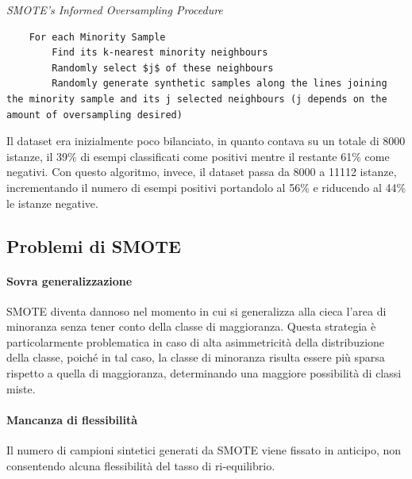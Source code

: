\lstset{style=customAlg}
\begin{algorithm}
	\caption{\emph{SMOTE’s Informed Oversampling Procedure}}
	\begin{lstlisting}
	For each Minority Sample
	    Find its k-nearest minority neighbours
	    Randomly select $j$ of these neighbours
	    Randomly generate synthetic samples along the lines joining the minority sample and its j selected neighbours (j depends on the amount of oversampling desired) 
	\end{lstlisting}
\end{algorithm}

Il dataset era inizialmente poco bilanciato, in quanto contava su un totale di 8000 istanze, il 39\% di esempi classificati come positivi mentre il restante 61\% come negativi. Con questo algoritmo, invece, il dataset passa da 8000 a 11112 istanze, incrementando il numero di esempi positivi portandolo al 56\% e riducendo al 44\% le istanze negative.
\subsection{Problemi di SMOTE}
\paragraph{Sovra generalizzazione}
SMOTE diventa dannoso nel momento in cui si generalizza alla cieca l'area di minoranza senza tener conto della classe di maggioranza. Questa strategia è particolarmente problematica in caso di alta asimmetricità della distribuzione della classe, poiché in tal caso, la classe di minoranza risulta essere più sparsa rispetto a quella di maggioranza, determinando una maggiore possibilità di classi miste.

\paragraph{Mancanza di flessibilità}
Il numero di campioni sintetici generati da SMOTE viene fissato in anticipo, non consentendo alcuna flessibilità del tasso di ri-equilibrio.

